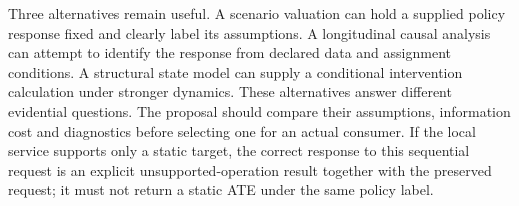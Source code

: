 Three alternatives remain useful. A scenario valuation can hold a supplied
policy response fixed and clearly label its assumptions. A longitudinal
causal analysis can attempt to identify the response from declared data and
assignment conditions. A structural state model can supply a conditional
intervention calculation under stronger dynamics. These alternatives answer
different evidential questions. The proposal should compare their assumptions,
information cost and diagnostics before selecting one for an actual consumer.
If the local service supports only a static target, the correct response to
this sequential request is an explicit unsupported-operation result together
with the preserved request; it must not return a static ATE under the same
policy label.
